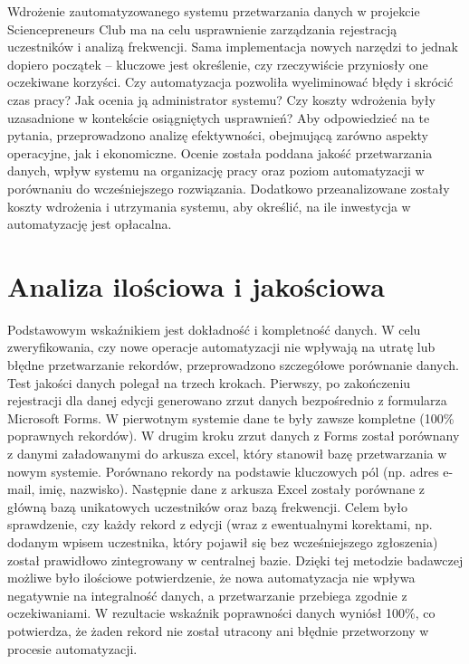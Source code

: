 Wdrożenie zautomatyzowanego systemu przetwarzania danych w projekcie Sciencepreneurs Club ma na celu usprawnienie zarządzania rejestracją uczestników i analizą frekwencji. Sama implementacja nowych narzędzi to jednak dopiero początek – kluczowe jest określenie, czy rzeczywiście przyniosły one oczekiwane korzyści. Czy automatyzacja pozwoliła wyeliminować błędy i skrócić czas pracy? Jak ocenia ją administrator systemu? Czy koszty wdrożenia były uzasadnione w kontekście osiągniętych usprawnień? Aby odpowiedzieć na te pytania, przeprowadzono analizę efektywności, obejmującą zarówno aspekty operacyjne, jak i ekonomiczne. Ocenie została poddana jakość przetwarzania danych, wpływ systemu na organizację pracy oraz poziom automatyzacji w porównaniu do wcześniejszego rozwiązania. Dodatkowo przeanalizowane zostały koszty wdrożenia i utrzymania systemu, aby określić, na ile inwestycja w automatyzację jest opłacalna.

\section{Analiza ilościowa i jakościowa}

Podstawowym wskaźnikiem jest dokładność i kompletność danych. W celu zweryfikowania, czy nowe operacje automatyzacji nie wpływają na utratę lub błędne przetwarzanie rekordów, przeprowadzono szczegółowe porównanie danych. Test jakości danych polegał na trzech krokach. Pierwszy, po zakończeniu rejestracji dla danej edycji generowano zrzut danych bezpośrednio z formularza Microsoft Forms. W pierwotnym systemie dane te były zawsze kompletne (100\% poprawnych rekordów). W drugim kroku zrzut danych z Forms został porównany z danymi załadowanymi do arkusza \gls{excel}, który stanowił bazę przetwarzania w nowym systemie. Porównano rekordy na podstawie kluczowych pól (np. adres e-mail, imię, nazwisko). Następnie dane z arkusza Excel zostały porównane z główną bazą unikatowych uczestników oraz bazą frekwencji. Celem było sprawdzenie, czy każdy rekord z edycji (wraz z ewentualnymi korektami, np. dodanym wpisem uczestnika, który pojawił się bez wcześniejszego zgłoszenia) został prawidłowo zintegrowany w centralnej bazie. Dzięki tej metodzie badawczej możliwe było ilościowe potwierdzenie, że nowa automatyzacja nie wpływa negatywnie na integralność danych, a przetwarzanie przebiega zgodnie z oczekiwaniami. W rezultacie wskaźnik poprawności danych wyniósł 100\%, co potwierdza, że żaden rekord nie został utracony ani błędnie przetworzony w procesie automatyzacji.

